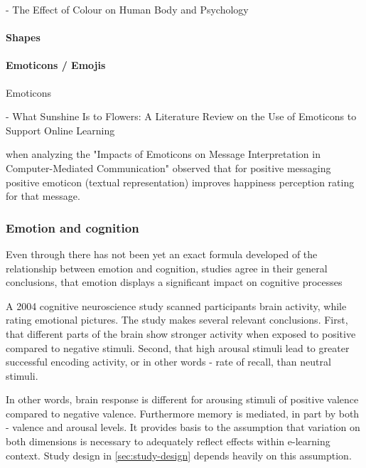 		\cite{Tekirdag2015} - The Effect of Colour on Human Body and Psychology
		
		\paragraph{Shapes}
		
		
		\paragraph{Emoticons / Emojis} Emoticons
		
		\cite{Dunlap2016} - What Sunshine Is to Flowers: A Literature Review on the Use of Emoticons to Support Online Learning
		
		\cite{Walther2001} when analyzing the "Impacts of Emoticons on Message Interpretation in Computer-Mediated Communication" observed that for positive messaging positive emoticon (textual representation) improves happiness perception rating for that message. 
			
		
		\subsubsection{Emotion and cognition} \label{sec:emotion-cognition}
		
		Even through there has not been yet an exact formula developed of the relationship between emotion and cognition, studies agree in their general conclusions, that emotion displays a significant impact on cognitive processes \cite{Sakaki2012}
		
		A 2004 cognitive neuroscience study \cite{Dolcos2004} scanned participants brain activity, while rating emotional pictures. The study makes several relevant conclusions. First, that different parts of the brain show stronger activity when exposed to positive compared to negative stimuli. Second, that high arousal stimuli lead to greater successful encoding activity, or in other words - rate of recall, than neutral stimuli. 
		
		In other words, brain response is different for arousing stimuli of positive valence compared to negative valence. Furthermore memory is mediated, in part by both - valence and arousal levels. It provides basis to the assumption that variation on both dimensions is necessary to adequately reflect effects within e-learning context. Study design in \ref{sec:study-design} depends heavily on this assumption.
		
